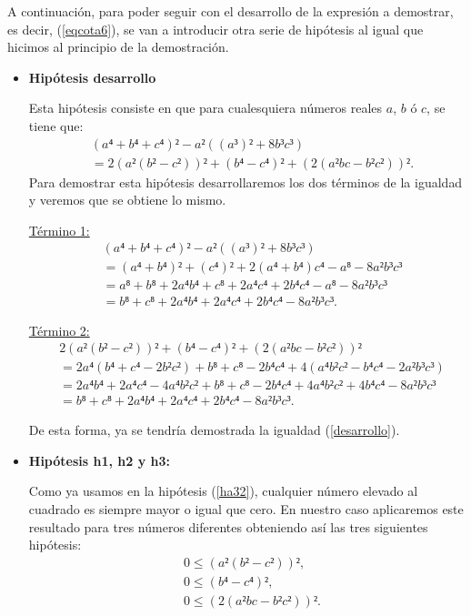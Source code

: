 \begin{demostracion}
  A continuación, para poder seguir con el desarrollo de la expresión a
  demostrar, es decir, (\ref{eqcota6}), se van a introducir otra serie de
  hipótesis al igual que hicimos al principio de la demostración.
  \begin{itemize}
  \item \textbf{Hipótesis desarrollo}

    Esta hipótesis consiste en que para cualesquiera números reales
    \(a\), \(b\) ó \(c\), se tiene que:
    \begin{align*}\label{desarrollo}\tag{desarrollo}
      & (a⁴+b⁴+c⁴)²-a²((a³)²+8b³c³) \\
      & = 2(a²(b²-c²))²+(b⁴-c⁴)²+(2(a²bc-b²c²))².
    \end{align*}
    Para demostrar esta hipótesis desarrollaremos los dos términos de la
    igualdad y veremos que se obtiene lo mismo.

    \underline{Término 1:}
    \begin{align*}
      & (a⁴+b⁴+c⁴)²-a²((a³)²+8b³c³)\\
      & = (a⁴+b⁴)²+(c⁴)²+2(a⁴+b⁴)c⁴-a⁸-8a²b³c³\\
      & = a⁸+b⁸+2a⁴b⁴+c⁸+2a⁴c⁴+2b⁴c⁴-a⁸-8a²b³c³\\
      & = b⁸+c⁸+2a⁴b⁴+2a⁴c⁴+2b⁴c⁴-8a²b³c³.
    \end{align*}

    \underline{Término 2:}
    \begin{align*}
      & 2(a²(b²-c²))²+(b⁴-c⁴)²+(2(a²bc-b²c²))² \\
      & = 2a⁴(b⁴+c⁴-2b²c²)+b⁸+c⁸-2b⁴c⁴+4(a⁴b²c²-b⁴c⁴-2a²b³c³)\\
      & = 2a⁴b⁴+2a⁴c⁴-4a⁴b²c²+b⁸+c⁸-2b⁴c⁴+4a⁴b²c²+4b⁴c⁴-8a²b³c³\\
      & = b⁸+c⁸+2a⁴b⁴+2a⁴c⁴+2b⁴c⁴-8a²b³c³.
    \end{align*}

    De esta forma, ya se tendría demostrada la igualdad (\ref{desarrollo}).

  \item \textbf{Hipótesis h1, h2 y h3:}

    Como ya usamos en la hipótesis (\ref{ha32}), cualquier número
    elevado al cuadrado es siempre mayor o igual que cero. En nuestro
    caso aplicaremos este resultado para tres números diferentes
    obteniendo así las tres siguientes hipótesis:
    \begin{align}
      &0 ≤ (a²(b²-c²))²,\label{h1cota}\tag{h1}\\
      &0 ≤ (b⁴-c⁴)², \label{h2cota}\tag{h2}\\
      &0 ≤ (2(a²bc-b²c²))².\label{h3cota}\tag{h3}
    \end{align}


\end{itemize}
\end{demostracion}
